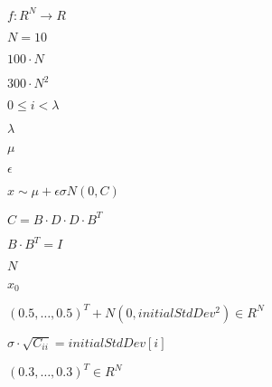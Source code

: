 \documentclass{article}
\begin{document}
$f: R^N \rightarrow R$
\pagebreak

$N=10$
\pagebreak

$100\cdot N$
\pagebreak

$300\cdot N^2$
\pagebreak

$0\leq i<\lambda$
\pagebreak

$\lambda$
\pagebreak

$\mu$
\pagebreak

$\epsilon$
\pagebreak

$x \sim \mu + \epsilon \sigma N(0,C)$
\pagebreak

$C = B \cdot D \cdot D \cdot B^T$
\pagebreak

$B \cdot B^T = I$
\pagebreak

$N$
\pagebreak

$x_0$
\pagebreak

$(0.5,\ldots,0.5)^T + N(0, initialStdDev^2) \in R^N$
\pagebreak

$\sigma \cdot \sqrt{C_{ii}} =
                 initialStdDev[i]$
\pagebreak

$(0.3,\ldots,0.3)^T \in R^N$
\pagebreak
\end{document}
